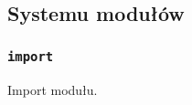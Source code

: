 \subsection{Systemu modułów}
\label{viua_vm_ops_module_system}

\subsubsection{\texttt{import}}

Import modułu.
